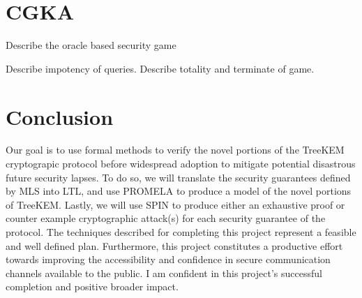 \documentclass[12pt,twocolumn]{article}
\begin{document}
	\section*{CGKA}
	
	Describe the oracle based security game
	
	Describe impotency of queries. Describe totality and terminate of game.
	
	\section*{Conclusion}
	
	Our goal is to use formal methods to verify the novel portions of the TreeKEM cryptograpic protocol before widespread adoption to mitigate potential disastrous future security lapses. To do so, we will translate the security guarantees defined by MLS into LTL, and use PROMELA to produce a model of the novel portions of TreeKEM. Lastly, we will use SPIN to produce either an exhaustive proof or counter example cryptographic attack(s) for each security guarantee of the protocol. The techniques described for completing this project represent a feasible and well defined plan. Furthermore, this project constitutes a productive effort towards improving the accessibility and confidence in secure communication channels available to the public. I am confident in this project's successful completion and positive broader impact.
	
	\onecolumn
	
	
\end{document}
